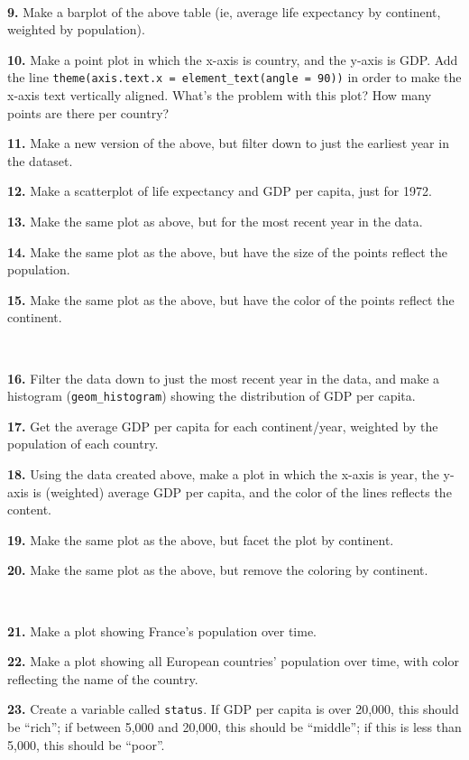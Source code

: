 \documentclass[
]{book}
\begin{document}
~

\textbf{9.} Make a barplot of the above table (ie, average life expectancy by continent, weighted by population).

\textbf{10.} Make a point plot in which the x-axis is country, and the y-axis is GDP. Add the line \texttt{theme(axis.text.x\ =\ element\_text(angle\ =\ 90))} in order to make the x-axis text vertically aligned. What's the problem with this plot? How many points are there per country?

\textbf{11.} Make a new version of the above, but filter down to just the earliest year in the dataset.

\textbf{12.} Make a scatterplot of life expectancy and GDP per capita, just for 1972.

\textbf{13.} Make the same plot as above, but for the most recent year in the data.

\textbf{14.} Make the same plot as the above, but have the size of the points reflect the population.

\textbf{15.} Make the same plot as the above, but have the color of the points reflect the continent.

~

\textbf{16.} Filter the data down to just the most recent year in the data, and make a histogram (\texttt{geom\_histogram}) showing the distribution of GDP per capita.

\textbf{17.} Get the average GDP per capita for each continent/year, weighted by the population of each country.

\textbf{18.} Using the data created above, make a plot in which the x-axis is year, the y-axis is (weighted) average GDP per capita, and the color of the lines reflects the content.

\textbf{19.} Make the same plot as the above, but facet the plot by continent.

\textbf{20.} Make the same plot as the above, but remove the coloring by continent.

~

\textbf{21.} Make a plot showing France's population over time.

\textbf{22.} Make a plot showing all European countries' population over time, with color reflecting the name of the country.

\textbf{23.} Create a variable called \texttt{status}. If GDP per capita is over 20,000, this should be ``rich''; if between 5,000 and 20,000, this should be ``middle''; if this is less than 5,000, this should be ``poor''.
\end{document}
